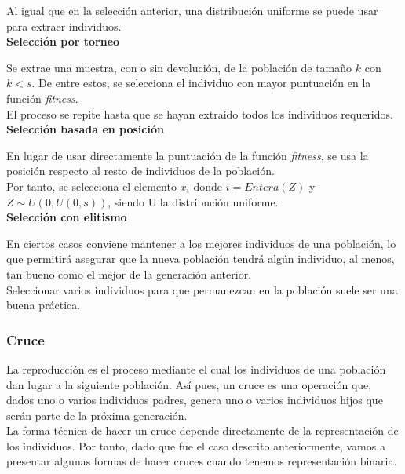 			Al igual que en la selecci\'on anterior, una distribuci\'on uniforme se puede usar para extraer individuos.\\
			
			\textbf{Selecci\'on por torneo}
			
			Se extrae una muestra, con o sin devoluci\'on, de la poblaci\'on de tama\~no $k$ con $k<s$. De entre estos, se selecciona el individuo con mayor puntuaci\'on en la funci\'on \textit{fitness}.\\
			
			El proceso se repite hasta que se hayan extraido todos los individuos requeridos.\\
			
			\textbf{Selecci\'on basada en posición}
			
			En lugar de usar directamente la puntuaci\'on de la funci\'on \textit{fitness}, se usa la posici\'on respecto al resto de individuos de la poblaci\'on.\\
			
			Por tanto, se selecciona el elemento $x_i$ donde $i=Entera(Z)$ y $Z\sim U(0,U(0,s))$, siendo U la distribuci\'on uniforme.\\
			
			\textbf{Selecci\'on con elitismo}
			
			En ciertos casos conviene mantener a los mejores individuos de una poblaci\'on, lo que permitir\'a asegurar que la nueva poblaci\'on tendr\'a alg\'un individuo, al menos, tan bueno como el mejor de la generaci\'on anterior.\\
			
			Seleccionar varios individuos para que permanezcan en la poblaci\'on suele ser una buena pr\'actica.\\
			
			\subsubsection{Cruce}
			
			La reproducci\'on es el proceso mediante el cual los individuos de una poblaci\'on dan lugar a la siguiente poblaci\'on. As\'i pues, un cruce es una operaci\'on que, dados uno o varios individuos padres, genera uno o varios individuos hijos que ser\'an parte de la pr\'oxima generaci\'on.\\
			
			La forma t\'ecnica de hacer un cruce depende directamente de la representaci\'on de los individuos. Por tanto, dado que fue el caso descrito anteriormente, vamos a presentar algunas formas de hacer cruces cuando tenemos representaci\'on binaria.\\
			
